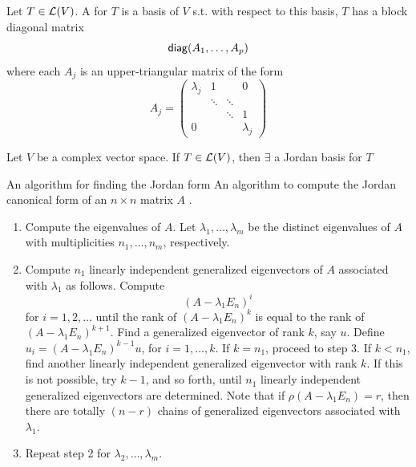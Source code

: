 \documentclass[aspectratio=169]{beamer}
\begin{document}
\begin{frame}
\begin{definition}
Let $T\in\mathcal{L}(V)$. A  for $T$ is a basis of $V$ s.t. with respect to this basis, $T$ has a block diagonal matrix
\[
\mathsf{diag}(A_1,\ldots,A_p)
\]
where each $A_j$ is an upper-triangular matrix of the form
\[
A_j=
\begin{pmatrix}
\lambda_j & 1 & & 0 \\
& \ddots & \ddots & \\
& & \ddots & 1 \\
0 & & & \lambda_j
\end{pmatrix}
\]
\end{definition}

\begin{importanttheorem}
Let $V$ be a complex vector space. If $T\in\mathcal{L}(V)$, then $\exists$ a Jordan basis for $T$
\end{importanttheorem}
\end{frame}


\begin{frame}{An algorithm for finding the Jordan form}
An algorithm to compute the Jordan canonical form of an $n\times n$
matrix $A$ \cite{MillerMichel1982}.
\begin{enumerate}
\item Compute the eigenvalues of $A$. Let $\lambda_1,\ldots,\lambda_m$
be the distinct eigenvalues of $A$ with multiplicities
$n_1,\ldots,n_m$, respectively.
\item Compute $n_1$ linearly independent generalized eigenvectors of
$A$ associated with $\lambda_1$ as follows. Compute
\[
(A-\lambda_1 E_n)^i
\]
for $i=1,2,\ldots$ until the rank of $(A-\lambda_1E_n)^k$ is equal to
the rank of $(A-\lambda_1E_n)^{k+1}$. Find a generalized eigenvector
of rank $k$, say $u$. Define $u_i=(A-\lambda_1E_n)^{k-1}u$, for
$i=1,\ldots,k$. If $k=n_1$, proceed to step 3. If $k<n_1$, find
another linearly independent generalized eigenvector with rank $k$. If
this is not possible, try $k-1$, and so forth, until $n_1$ linearly
independent generalized eigenvectors are determined. Note that if
$\rho(A-\lambda_1E_n)=r$, then there are totally $(n-r)$ chains of
generalized eigenvectors associated with $\lambda_1$.
\item Repeat step 2 for $\lambda_2,\ldots,\lambda_m$.
\end{enumerate}
\end{frame}
\end{document}
